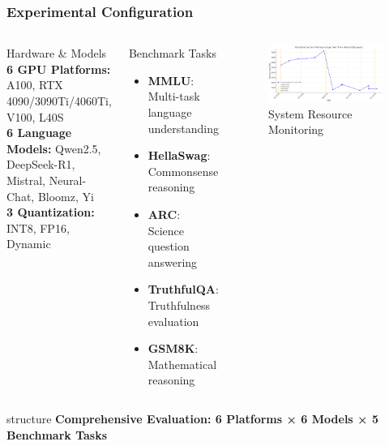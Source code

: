 \documentclass[aspectratio=169,xcolor=dvipsnames]{beamer}
\begin{document}
\begin{frame}
\frametitle{Experimental Configuration}

\begin{columns}[c]
\begin{block}{Hardware \& Models}
\textbf{6 GPU Platforms:} A100, RTX 4090/3090Ti/4060Ti, V100, L40S\\
\textbf{6 Language Models:} Qwen2.5, DeepSeek-R1, Mistral, Neural-Chat, Bloomz, Yi\\
\textbf{3 Quantization:} INT8, FP16, Dynamic
\end{block}

\begin{block}{Benchmark Tasks}
\begin{itemize}
\item \textbf{MMLU}: Multi-task language understanding
\item \textbf{HellaSwag}: Commonsense reasoning
\item \textbf{ARC}: Science question answering
\item \textbf{TruthfulQA}: Truthfulness evaluation
\item \textbf{GSM8K}: Mathematical reasoning
\end{itemize}
\end{block}

\begin{figure}
\centering
\includegraphics[width=\textwidth]{img/System_Memory_Usage.png}
\caption{System Resource Monitoring}
\end{figure}

\end{columns}

\vspace{0.3cm}
\begin{center}
\begin{beamercolorbox}[wd=\textwidth,center]{structure}
\textbf{Comprehensive Evaluation: 6 Platforms × 6 Models × 5 Benchmark Tasks}
\end{beamercolorbox}
\end{center}
\end{frame}
\end{document}
